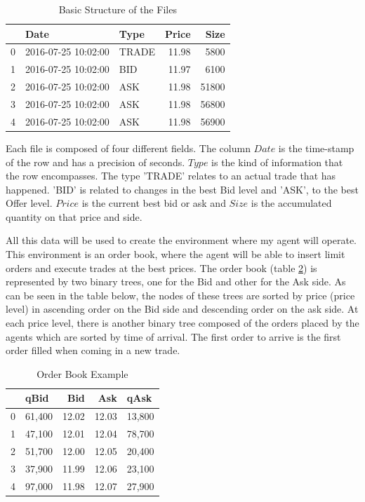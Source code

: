\documentclass[a4paper]{article}
\begin{document}
\begin{table}[ht!]
\centering
\begin{tabular}{l|llrr}
{} &                Date &   Type &  Price &   Size \\
\midrule
0 & 2016-07-25 10:02:00 &  TRADE &  11.98 &   5800 \\
1 & 2016-07-25 10:02:00 &    BID &  11.97 &   6100 \\
2 & 2016-07-25 10:02:00 &    ASK &  11.98 &  51800 \\
3 & 2016-07-25 10:02:00 &    ASK &  11.98 &  56800 \\
4 & 2016-07-25 10:02:00 &    ASK &  11.98 &  56900 \\

\end{tabular}
\caption{\label{tab:original_data}Basic Structure of the Files}
\end{table}

Each file is composed of four different fields. The column $Date$ is the time-stamp of the row and has a precision of seconds. $Type$ is the kind of information that the row encompasses. The type 'TRADE' relates to an actual trade that has happened. 'BID' is related to changes in the best Bid level and 'ASK', to the best Offer level. $Price$ is the current best bid or ask and $Size$ is the accumulated quantity on that price and side.

All this data will be used to create the environment where my agent will operate. This environment is an order book, where the agent will be able to insert limit orders and execute trades at the best prices. The order book (table \ref{tab:order_book}) is represented by two binary trees, one for the Bid and other for the Ask side. As can be seen in the table below, the nodes of these trees are sorted by price (price level) in ascending order on the Bid side and descending order on the ask side. At each price level, there is another binary tree composed of the orders placed by the agents which are sorted by time of arrival. The first order to arrive is the first order filled when coming in a new trade.

\begin{table}[ht!]
\centering
\begin{tabular}{l|lrrl}
{} &    qBid &    Bid &    Ask &    qAsk \\
\midrule
0 &  61,400 &  12.02 &  12.03 &  13,800 \\
1 &  47,100 &  12.01 &  12.04 &  78,700 \\
2 &  51,700 &  12.00 &  12.05 &  20,400 \\
3 &  37,900 &  11.99 &  12.06 &  23,100 \\
4 &  97,000 &  11.98 &  12.07 &  27,900 \\

\end{tabular}
\caption{\label{tab:order_book}Order Book Example}
\end{table}
\end{document}
